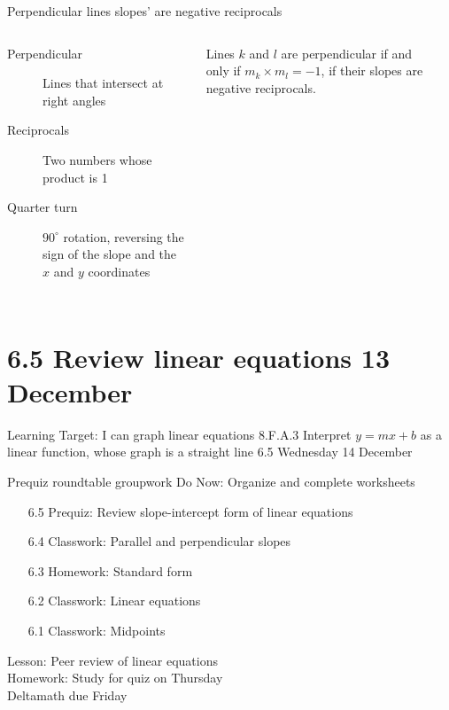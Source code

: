 \begin{frame}{Perpendicular lines slopes' are negative reciprocals}
  \begin{columns}
    \begin{description}
      \item[Perpendicular] Lines that intersect at right angles
      \item[Reciprocals] Two numbers whose product is 1
      \item[Quarter turn] $90^\circ$ rotation, reversing the sign of the slope and the $x$ and $y$ coordinates
    \end{description} \bigskip
    Lines $k$ and $l$ are perpendicular if and only if $m_k \times m_l = -1$, if their slopes are negative reciprocals.
    \begin{flushright}
    \end{flushright}
  \end{columns}
\end{frame}

\section{6.5 Review linear equations \hfill 13 December \,}
\begin{frame}{Learning Target: I can graph linear equations}
  {8.F.A.3 Interpret $y=mx+b$ as a linear function, whose graph is a straight line \hfill \alert{6.5 Wednesday 14 December}}
  \begin{block}{Prequiz roundtable groupwork}
    Do Now: Organize and complete worksheets
    \begin{itemize}
      \item[6.5] Prequiz: Review slope-intercept form of linear equations
      \item[6.4] Classwork: Parallel and perpendicular slopes
      \item[6.3] Homework: Standard form
      \item[6.2] Classwork: Linear equations
      \item[6.1] Classwork: Midpoints
    \end{itemize}
      Lesson: Peer review of linear equations \\
      Homework: Study for quiz on Thursday \\
      Deltamath due Friday
  \end{block}
\end{frame}

